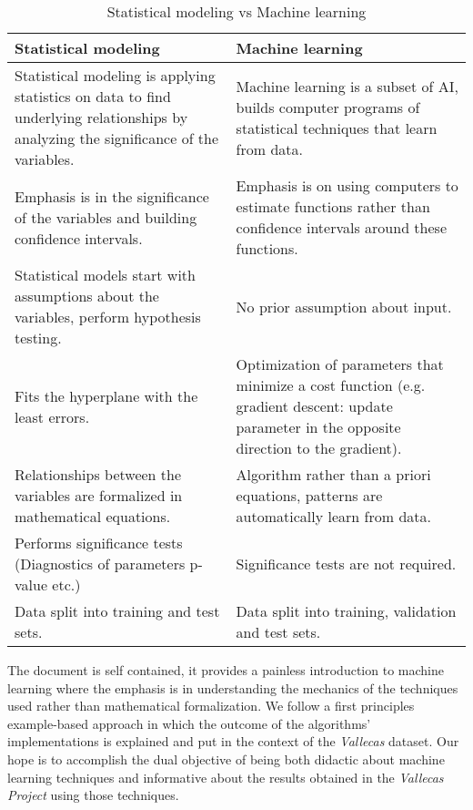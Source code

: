 \documentclass[11pt]{article}
\theoremstyle{definition}
\theoremstyle{remark}
\begin{document}
\begin{table}[htbp]
    \centering
    \begin{tabularx}{\textwidth}{bb}
        \hline
        Statistical modeling     & Machine learning        \\ \hline
        Statistical modeling is applying statistics on data to find underlying relationships by analyzing the significance of the variables.         & Machine learning is a subset of AI, builds computer programs of statistical techniques that learn from data.                \\ \hline
        Emphasis is in the significance of the variables and building confidence intervals. & Emphasis is on using computers to estimate functions rather than confidence intervals around these functions.             \\ \hline
        Statistical models start with assumptions about the variables, perform hypothesis testing. & No prior assumption about input. \\  \hline
        Fits the hyperplane with the least errors. & Optimization of parameters that minimize a cost function (e.g. gradient descent: update parameter in the opposite direction to the gradient). \\  \hline
		Relationships between the variables are formalized in mathematical equations.& Algorithm rather than a priori equations, patterns are automatically learn from data.\\  \hline
		Performs significance tests (Diagnostics of parameters p-value etc.)& Significance tests are not required.\\  \hline
		Data split into training and test sets. & Data split into training, validation and test sets.\\  \hline	
    \end{tabularx}
    \caption{Statistical modeling vs Machine learning}  \label{tab:smml}
\end{table}

The document is self contained, it provides a painless introduction to machine learning where the emphasis is in understanding the mechanics of the techniques used rather than mathematical formalization. We follow a first principles example-based approach in which the outcome of the algorithms' implementations is explained and put in the context of the  \emph{Vallecas} dataset. Our hope is to accomplish the dual objective of being both didactic about machine learning techniques and informative about the results obtained in the \emph{Vallecas Project} using those techniques.
\end{document}
